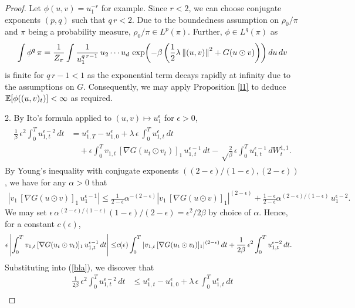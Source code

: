 \documentclass[11pt, twoside]{report}
\begin{document}
\begin{proof}  
Let $\phi(u,v)=u_1^{-r}$ for example. Since $r<2$, we can choose conjugate exponents  $(p,q)$ such that $q\,r<2$. Due to the boundedness assumption on $\rho_0/\pi$ and $\pi$ being a probability measure, $\rho_0/\pi\in L^p(\pi)$. Further, $\phi\in L^q(\pi)$  as \[
\int \phi^q\, \pi = \frac{1}{Z_{\pi}} \int\frac{1}{u_1^{q\,r-1}} \,u_2\cdots u_d\, \exp\pp{-\beta\,\pp{\frac 12 \lambda\,\norm{(u,v)}^2 + G(u\odot v)}
}\,du\,dv\]
is finite for $q\,r-1<1$ as the exponential term decays rapidly at infinity due to the assumptions on $G$. Consequently, we may apply Proposition \ref{l1} to deduce $\mean{\phi((u,v)_t)}<\infty$ as required.

2.  By Ito's formula applied to $(u,v)\mapsto u_1^\epsilon$ for $\epsilon>0$,
 \begin{gather}
     \begin{split}
\frac{1}{\beta}\,\epsilon^2\int_0^T {u_{1,t}^{\epsilon-2}}\,dt
&=
{u_{1,T}^\epsilon}-{u_{1,0}^\epsilon}+\lambda\,\epsilon\,\int_0^T {u_{1,t}^\epsilon}\,dt\\
&\quad+ \epsilon\int_0^T v_{1,t} \,[\nabla G(u_t\odot v_t)]_1 \,u_{1,t}^{\epsilon-1}\,dt-\sqrt\frac{2}{\beta} \,\epsilon\int_0^T u_{1,t}^{\epsilon-1}\,dW^{1,1}_t.
\end{split}\label{bla}\end{gather}
By Young's inequality with conjugate exponents $((2-\epsilon)/(1-\epsilon),(2-\epsilon))$, we have for any $\alpha>0$ that
\begin{align*} |v_1 \,[\nabla G(u\odot v)]_1 \,u_1^{\epsilon-1}|\le
\frac{1}{2-\epsilon} \alpha^{-(2-\epsilon)} |v_1 \,[\nabla G(u\odot v)]_1 |^{(2-\epsilon)}+
\frac{1-\epsilon}{2-\epsilon}\alpha^{(2-\epsilon)/(1-\epsilon)}\,u_1^{\epsilon-2}.
\end{align*}
We may set $\epsilon\,\alpha^{(2-\epsilon)/(1-\epsilon)}(1-\epsilon)/(2-\epsilon)=\epsilon^2/2\beta$ by choice of $\alpha$. Hence,  for a constant $c(\epsilon)$,
\begin{align*}
\epsilon\,\abs{\int_0^T v_{1,t} \,[\nabla G(u_t\odot v_t)]_1\,u_{1,t}^{\epsilon-1}\,dt} \le& 
c(\epsilon)\int_0^T  |v_{1,t} \,[\nabla G(u_t\odot v_t)]_1 |^{(2-\epsilon)}\,dt + \frac{1}{2\beta}\,\epsilon^2\int_0^T {u_{1,t}^{\epsilon-2}}\,dt.
\end{align*}
Substituting into (\ref{bla}), we discover that
 \begin{align*}
\frac{1}{2\beta}\,\epsilon^2\int_0^T {u_{1,t}^{\epsilon-2}}\,dt
&\le
{u_{1,t}^\epsilon}-{u_{1,0}^\epsilon}+\lambda\,\epsilon\,\int_0^T {u_{1,t}^\epsilon}\,dt\\

\end{align*}
\end{proof}
\end{document}

